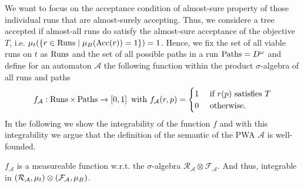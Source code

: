 We want to focus on the acceptance condition of almost-sure property of those
individual runs that are almost-surely accepting. Thus, we considere a tree
accepted if almost-all runs do satisfy the almost-sure acceptance of the
objective $T$, i.e. $\mu_{t}(\left\{r\in\operatorname{Runs}\mid\mu_{B}(\operatorname{Acc}(r)) = 1\right\}) = 1$.
Hence, we fix the set of all viable runs on $t$ as $\operatorname{Runs}$ and
the set of all possible paths in a run $\operatorname{Paths} = D^{\omega}$ and define for an
automaton $\mathcal{A}$ the following function within the product
$\sigma$-algebra of all runs and paths
\begin{equation*}
  f_{\mathcal{A}}:\operatorname{Runs}\times\operatorname{Paths}\rightarrow\left[0,1\right]
  \text{ with }
  f_{\mathcal{A}}(r, p) = \begin{cases}
    1&\text{ if }r(p)\text{ satisfies }T\\
    0&\text{ otherwise.}
  \end{cases}
\end{equation*}
In the following we show the integrability of the function $f$ and with this
integrability we argue that the definition of the semantic of the \ac{PWA}
$\mathcal{A}$ is well-founded.
\begin{proposition}
  $f_{\mathcal{A}}$ is a measureable function w.r.t. the $\sigma$-algebra
  $\mathcal{R}_{\mathcal{A}}\otimes\mathcal{F}_{\mathcal{A}}$. And thus,
  integrable in $\left(\mathcal{R}_{\mathcal{A}},\mu_{t}\right)\otimes
  \left(\mathcal{F}_{\mathcal{A}},\mu_{B}\right)$.
\end{proposition}
